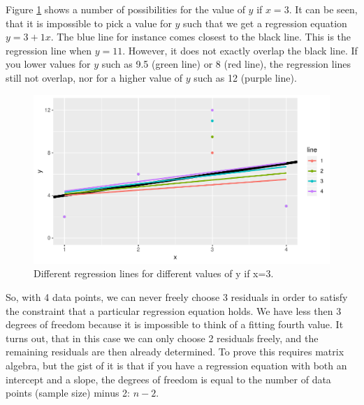 \documentclass[]{report}\usepackage[]{graphicx}\usepackage[]{color}
\makeatletter
\def\maxwidth{ %
  \ifdim\Gin@nat@width>\linewidth
    \linewidth
  \else
    \Gin@nat@width
  \fi
}
\newenvironment{knitrout}{}{} %
\makeatother
\begin{document}
Figure \ref{fig:inf_13} shows a number of possibilities for the value of $y$ if $x=3$. It can be seen, that it is impossible to pick a value for $y$ such that we get a regression equation $y=3+1x$. The blue line for instance comes closest to the black line. This is the regression line when $y=11$. However, it does not exactly overlap the black line. If you lower values for $y$ such as 9.5 (green line) or 8 (red line), the regression lines still not overlap, nor for a higher value of $y$ such as 12 (purple line).

\begin{knitrout}
\color{fgcolor}\begin{figure}

{\centering \includegraphics[width=\maxwidth]{figure/inf_13-1} 

}

\caption[Different regression lines for different values of y if x=3]{Different regression lines for different values of y if x=3.}\label{fig:inf_13}
\end{figure}


\end{knitrout}

So, with 4 data points, we can never freely choose 3 residuals in order to satisfy the constraint that a particular regression equation holds. We have less then 3 degrees of freedom because it is impossible to think of a fitting fourth value. It turns out, that in this case we can only choose 2 residuals freely, and the remaining residuals are then already determined. To prove this requires matrix algebra, but the gist of it is that if you have a regression equation with both an intercept and a slope, the degrees of freedom is equal to the number of data points (sample size) minus 2: $n-2$.
\end{document}

